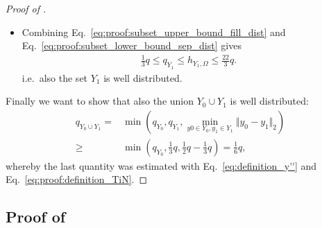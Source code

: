 \documentclass[a4paper, 10pt]{article}
\begin{document}
\begin{proof}[Proof of ]
\begin{itemize}
Thus we finally obtain
\begin{align}
\label{eq:proof:subset_lower_bound_sep_dist}
q_{Y_1} \geq 2q_{Y_1''} + \frac{2}{3} q \geq q - \frac{2}{3}q = \frac{1}{3}q.
\end{align}
\item Combining Eq.\ \eqref{eq:proof:subset_upper_bound_fill_dist} and Eq.\ \eqref{eq:proof:subset_lower_bound_sep_dist} gives
\begin{align*}
\frac{1}{3} q \leq q_{Y_1} \leq h_{Y_1, \Omega} \leq \frac{22}{3}q.
\end{align*}
i.e.\ also the set $Y_1$ is well distributed.
\end{itemize}
Finally we want to show that also the union $Y_0 \cup Y_1$ is well distributed:
\begin{align*}
q_{Y_0 \cup Y_1} =& \min (q_{Y_0}, q_{Y_1}, \min_{y0 \in Y_0, y_1 \in Y_1} \Vert y_0 - y_1 \Vert_2) \\
\geq& \min \left(q_{Y_0}, \frac{1}{3}q, \frac{1}{2}q - \frac{1}{3}q \right) = \frac{1}{6}q,
\end{align*}
whereby the last quantity was estimated with Eq.~\eqref{eq:definition_y''} and Eq.~\eqref{eq:proof:definition_TiN}.
\end{proof}

\subsection{Proof of }
\end{document}

